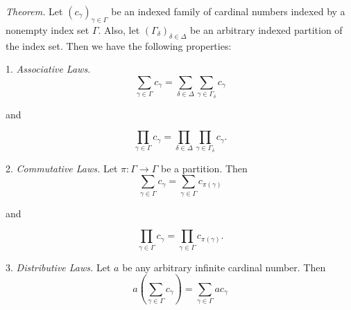 \documentclass[12pt]{article}
\begin{document}
\emph{Theorem.}
Let $\displaystyle \left(c_\gamma \right)_{\gamma \in \Gamma}$ be an indexed family of cardinal numbers indexed by a nonempty index set $\Gamma$. Also, let $\displaystyle \left({\Gamma}_\delta\right)_{\delta \in \Delta}$ be an arbitrary indexed partition of the index set. Then we have the following properties:

1. \emph{Associative Laws.}
\[   
\sum_{\gamma \in \Gamma}{c_\gamma} = \sum_{\delta \in \Delta} \sum_{\gamma \in {\Gamma}_\delta}{c_\gamma} 
\]
\begin{center}
and 
\end{center}
\[
\prod_{\gamma \in \Gamma}{c_\gamma} = \prod_{\delta \in \Delta} \prod_{\gamma \in {\Gamma}_\delta}{c_\gamma}. 
\]

2. \emph{Commutative Laws.} Let $\displaystyle \pi :\Gamma \to \Gamma$ be a partition. Then
\[
\sum_{\gamma \in \Gamma}{c_\gamma} =  \sum_{\gamma \in {\Gamma}}{c_{\pi(\gamma)}} 
\]
\begin{center}
and 
\end{center}
\[
\prod_{\gamma \in \Gamma}{c_\gamma} =  \prod_{\gamma \in {\Gamma}}{c_{\pi(\gamma)}}. 
\]

3. \emph{Distributive Laws.} Let $a$ be any arbitrary infinite cardinal number. Then
\[
a \left({\sum_{\gamma \in \Gamma}{c_\gamma}}\right) = \sum_{\gamma \in \Gamma}{a c_\gamma}
\]
\end{document}

